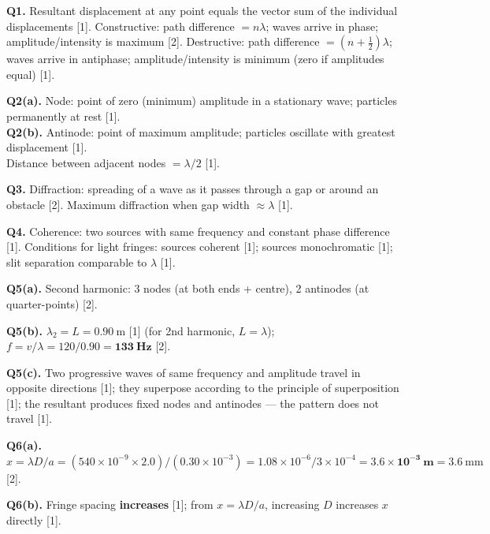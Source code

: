 \begin{markscheme}

\textbf{Q1.} Resultant displacement at any point equals the vector sum of the individual displacements [1]. Constructive: path difference $= n\lambda$; waves arrive in phase; amplitude/intensity is maximum [2]. Destructive: path difference $= (n+\tfrac{1}{2})\lambda$; waves arrive in antiphase; amplitude/intensity is minimum (zero if amplitudes equal) [1].

\vspace{0.5em}\textbf{Q2(a).} Node: point of zero (minimum) amplitude in a stationary wave; particles permanently at rest [1].\\
\textbf{Q2(b).} Antinode: point of maximum amplitude; particles oscillate with greatest displacement [1].\\
Distance between adjacent nodes $= \lambda/2$ [1].

\vspace{0.5em}\textbf{Q3.} Diffraction: spreading of a wave as it passes through a gap or around an obstacle [2]. Maximum diffraction when gap width $\approx \lambda$ [1].

\vspace{0.5em}\textbf{Q4.} Coherence: two sources with same frequency and constant phase difference [1]. Conditions for light fringes: sources coherent [1]; sources monochromatic [1]; slit separation comparable to $\lambda$ [1].

\vspace{0.5em}\textbf{Q5(a).} Second harmonic: 3 nodes (at both ends + centre), 2 antinodes (at quarter-points) [2].

\vspace{0.5em}\textbf{Q5(b).} $\lambda_2 = L = 0.90\ \text{m}$ [1] (for 2nd harmonic, $L = \lambda$); $f = v/\lambda = 120/0.90 = \mathbf{133\ \text{Hz}}$ [2].

\vspace{0.5em}\textbf{Q5(c).} Two progressive waves of same frequency and amplitude travel in opposite directions [1]; they superpose according to the principle of superposition [1]; the resultant produces fixed nodes and antinodes — the pattern does not travel [1].

\vspace{0.5em}\textbf{Q6(a).} $x = \lambda D/a = (540\times10^{-9}\times2.0)/(0.30\times10^{-3}) = 1.08\times10^{-6}/3\times10^{-4} = \mathbf{3.6\times10^{-3}\ \text{m}} = 3.6\ \text{mm}$ [2].

\vspace{0.5em}\textbf{Q6(b).} Fringe spacing \textbf{increases} [1]; from $x = \lambda D/a$, increasing $D$ increases $x$ directly [1].


\end{markscheme}
